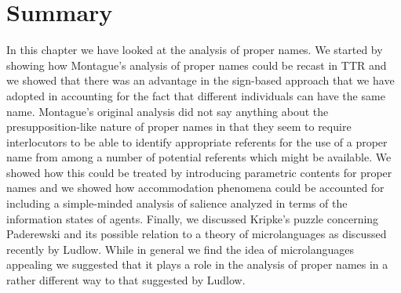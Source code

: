 
    


  



\section{Summary}

In this chapter we have looked at the analysis of proper names.  We
started by showing how Montague's analysis of proper names could be
recast in TTR and we showed that there was an advantage in the
sign-based approach that we have adopted in accounting for the fact
that different individuals can have the same name.  Montague's
original analysis did not say anything about the presupposition-like
nature of proper names in that they seem to require interlocutors to
be able to identify appropriate referents for the use of a proper name
from among a number of potential referents which might be available.
We showed how this could be treated by introducing parametric
contents for proper names and we showed how accommodation phenomena
could be accounted for including a simple-minded analysis of salience
analyzed in terms of the information states of agents.  Finally, we
discussed Kripke's puzzle concerning Paderewski and its possible
relation to a theory of microlanguages as discussed recently by
Ludlow.  While in general we find the idea of microlanguages appealing
we suggested that it plays a role in the analysis of proper names in a
rather different way to that suggested by Ludlow.  
  
  


